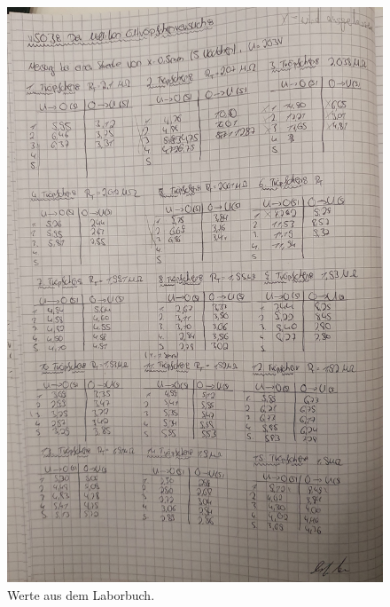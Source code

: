 \begin{figure}
    \includegraphics[width=14cm]{content/Laborbuch.jpg}
    \caption{Werte aus dem Laborbuch.}
\end{figure}

%













